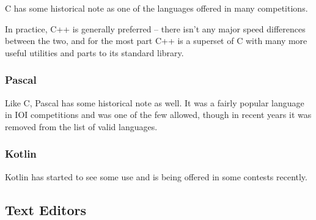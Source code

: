 C has some historical note as one of the languages offered in many competitions.

In practice, C++ is generally preferred -- there isn't any major speed differences between the two, and for the most part C++ is a superset of C with many more useful utilities and parts to its standard library.

\subsubsection{Pascal}

Like C, Pascal has some historical note as well. It was a fairly popular language in IOI competitions and was one of the few allowed, though in recent years it was removed from the list of valid languages.

\subsubsection{Kotlin}

Kotlin has started to see some use and is being offered in some contests recently.

\subsection{Text Editors}